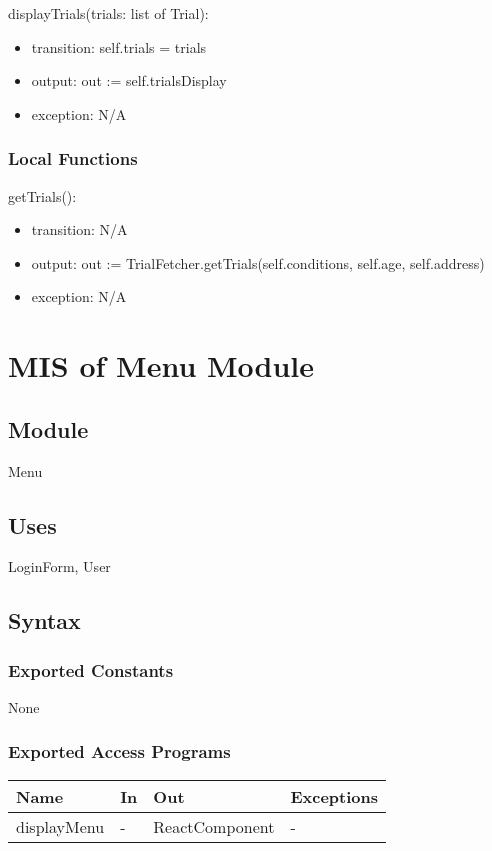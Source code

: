 \documentclass[12pt, titlepage]{article}
\begin{document}
\noindent displayTrials(trials: list of Trial):
\begin{itemize}
\item transition: self.trials = trials
\item output: out := self.trialsDisplay 
\item exception: N/A
\end{itemize}

\subsubsection{Local Functions}

\noindent getTrials():
\begin{itemize}
\item transition: N/A
\item output: out := TrialFetcher.getTrials(self.conditions, self.age, self.address)
\item exception: N/A
\end{itemize}

\section{MIS of Menu Module} \label{Menu}

\subsection{Module}

Menu

\subsection{Uses}
LoginForm, User

\subsection{Syntax}

\subsubsection{Exported Constants}
None

\subsubsection{Exported Access Programs}

\begin{center}
\begin{tabular}{p{4cm} p{4cm} p{4cm} p{4cm}}
\hline
\textbf{Name} & \textbf{In} & \textbf{Out} & \textbf{Exceptions} \\
\hline
displayMenu & - & ReactComponent & - \\
\hline
\end{tabular}
\end{center}
\end{document}
